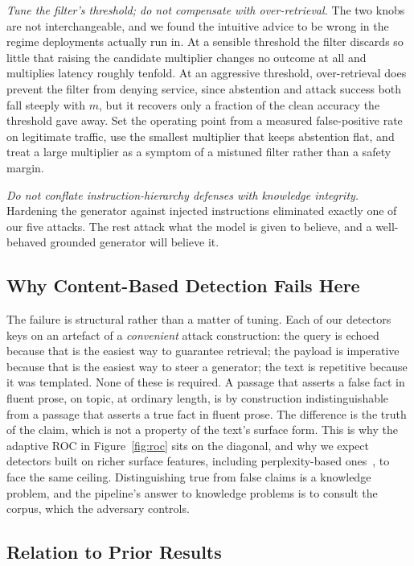 \emph{Tune the filter's threshold; do not compensate with over-retrieval.} The two knobs are
not interchangeable, and we found the intuitive advice to be wrong in the regime deployments
actually run in. At a sensible threshold the filter discards so little that raising the
candidate multiplier changes no outcome at all and multiplies latency roughly tenfold. At an
aggressive threshold, over-retrieval does prevent the filter from denying service, since
abstention and attack success both fall steeply with $m$, but it recovers only a fraction of
the clean
accuracy the threshold gave away. Set the operating point from a measured false-positive rate
on legitimate traffic, use the smallest multiplier that keeps abstention flat, and treat a
large multiplier as a symptom of a mistuned filter rather than a safety margin.

\emph{Do not conflate instruction-hierarchy defenses with knowledge integrity.} Hardening the
generator against injected instructions eliminated exactly one of our five attacks. The rest
attack what the model is given to believe, and a well-behaved grounded generator will believe
it.

\subsection{Why Content-Based Detection Fails Here}

The failure is structural rather than a matter of tuning. Each of our detectors keys on an
artefact of a \emph{convenient} attack construction: the query is echoed because that is the
easiest way to guarantee retrieval; the payload is imperative because that is the easiest way
to steer a generator; the text is repetitive because it was templated. None of these is
required. A passage that asserts a false fact in fluent prose, on topic, at ordinary length, is
by construction indistinguishable from a passage that asserts a true fact in fluent prose.
The difference is the truth of the claim, which is not a property of the text's surface form. This
is why the adaptive ROC in Figure~\ref{fig:roc} sits on the diagonal, and why we expect
detectors built on richer surface features, including perplexity-based
ones~\citep{alon2023perplexity,jain2023baseline}, to face the same ceiling. Distinguishing true
from false claims is a knowledge problem, and the pipeline's answer to knowledge problems is to
consult the corpus, which the adversary controls.

\subsection{Relation to Prior Results}

